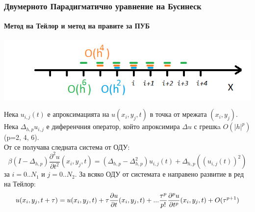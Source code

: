 \documentclass{beamer}
\begin{document}
\begin{frame}
\frametitle{Двумерното Парадигматично уравнение на Бусинеск}
\framesubtitle{Метод на Тейлор и метод на правите за ПУБ}
\begin{center}\vspace{0.25cm}
	\begin{minipage}[b]{0.45\linewidth}
		 \includegraphics[width=\linewidth]{../amitans/figures/FDS.png}
	\end{minipage}	
\end{center}
Нека $u_{i,j}(t)$ е апроксимацията на $u(x_i, y_j, t)$ в точка от мрежата $(x_i, y_j)$.
\\
Нека $\Delta_{h,p} u_{i,j}$ е диференчния оператор, който апроксимира $\Delta u$ с грешкa $O(|h|^p)$ (p=2, 4, 6).
\\
От  се получава следната система от ОДУ:
\begin{equation}\label{DiscreteEq}
\beta (I-\Delta_{h,p}) \frac{\partial^2 u}{\partial t^2}(x_i, y_j, t)=
 (\Delta_{h,p} - \Delta_{h,p}^2) u_{i, j}(t) + \Delta_{h,p} ( ( u_{i, j}(t) )^2 )
\end{equation}
за $i = 0..N_1$ и $j=0..N_2$. За всяко ОДУ от системата е направено развитие в ред на Тейлор:
\begin{align} \label{TSe}
\small
u(x_i, y_j, t+\tau) = u(x_i, y_j, t) + \tau \frac{ \partial u }{ \partial t }(x_i, y_j, t)  + ... 
\frac{ \tau^p }{ p! } \frac{ \partial^p u }{ \partial t^p }(x_i, y_j, t) + O(\tau^{p+1})
\end{align}

\end{frame}

\end{document}
